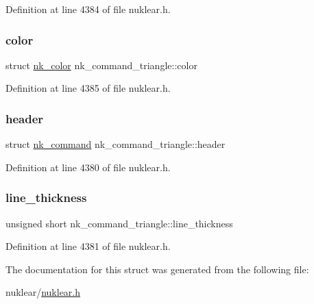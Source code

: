 Definition at line 4384 of file nuklear.\+h.

\mbox{\label{structnk__command__triangle_ae3698f324f8c4c5d654307c46d903b2b}} 
\subsubsection{\texorpdfstring{color}{color}}
{\footnotesize\ttfamily struct \mbox{\hyperlink{structnk__color}{nk\+\_\+color}} nk\+\_\+command\+\_\+triangle\+::color}



Definition at line 4385 of file nuklear.\+h.

\mbox{\label{structnk__command__triangle_ae39911e004d052d2546ea9a013eac7c2}} 
\subsubsection{\texorpdfstring{header}{header}}
{\footnotesize\ttfamily struct \mbox{\hyperlink{structnk__command}{nk\+\_\+command}} nk\+\_\+command\+\_\+triangle\+::header}



Definition at line 4380 of file nuklear.\+h.

\mbox{\label{structnk__command__triangle_a1a7b8926b82bbcd507142fbb337518f7}} 
\subsubsection{\texorpdfstring{line\+\_\+thickness}{line\_thickness}}
{\footnotesize\ttfamily unsigned short nk\+\_\+command\+\_\+triangle\+::line\+\_\+thickness}



Definition at line 4381 of file nuklear.\+h.



The documentation for this struct was generated from the following file\+:\begin{DoxyCompactItemize}
\item 
nuklear/\mbox{\hyperlink{nuklear_8h}{nuklear.\+h}}\end{DoxyCompactItemize}

